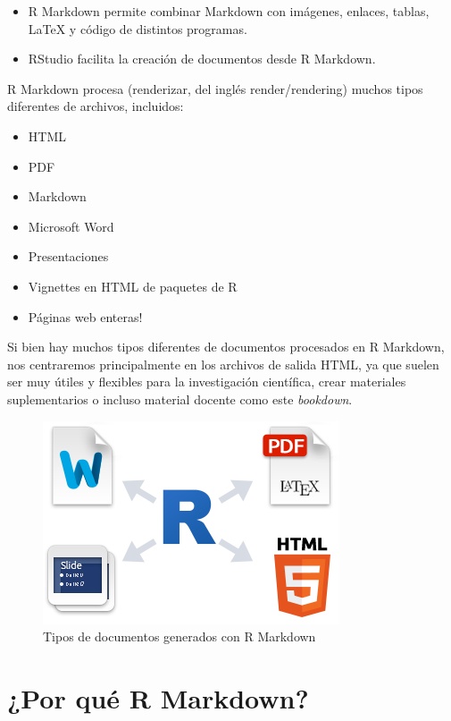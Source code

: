 \documentclass[
]{book}
\providecommand{\tightlist}{%
  \setlength{\itemsep}{0pt}\setlength{\parskip}{0pt}}
\begin{document}
\begin{itemize}
\tightlist
\item
  R Markdown permite combinar Markdown con imágenes, enlaces, tablas, LaTeX y código de distintos programas.
\item
  RStudio facilita la creación de documentos desde R Markdown.
\end{itemize}

R Markdown procesa (renderizar, del inglés render/rendering) muchos tipos diferentes de archivos, incluidos:

\begin{itemize}
\tightlist
\item
  HTML
\item
  PDF
\item
  Markdown
\item
  Microsoft Word
\item
  Presentaciones
\item
  Vignettes en HTML de paquetes de R
\item
  Páginas web enteras!
\end{itemize}

Si bien hay muchos tipos diferentes de documentos procesados en R Markdown, nos centraremos principalmente en los archivos de salida HTML, ya que suelen ser muy útiles y flexibles para la investigación científica, crear materiales suplementarios o incluso material docente como este \emph{bookdown}.

\begin{figure}
\centering
\includegraphics{figures/rmarkdown.png}
\caption{Tipos de documentos generados con R Markdown}
\end{figure}

\hypertarget{por-quuxe9-r-markdown}{%
\section{¿Por qué R Markdown?}\label{por-quuxe9-r-markdown}}
\end{document}
